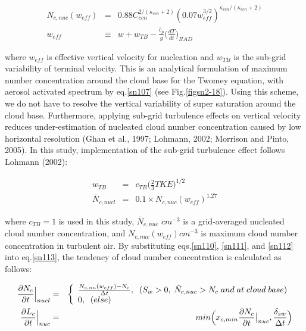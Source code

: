 \begin{eqnarray}
N_{c,nuc}(w_{eff})&=&0.88C_{ccn}^{2/(\kappa_{ccn}+2)}(0.07w_{eff}^{3/2})^{\kappa_{ccn}/(\kappa_{ccn}+2)}\label{sn110}\\
w_{eff}&\equiv&w+w_{TB}-\frac{\bar{c}_{p}}{g}\bigl(\frac{dT}{dt}\bigr)_{RAD}\label{sn111}
\end{eqnarray}

where $w_{eff}$ is effective vertical velocity for nucleation and $w_{TB}$ is the sub-grid variability of terminal velocity. This is an analytical formulation of maximum number concentration around the cloud base for the Twomey equation, with aerosol activated spectrum by eq.\ref{sn107} (see Fig.\ref{figsn2-18}). Using this scheme, we do not have to resolve the vertical variability of super saturation around the cloud base. Furthermore, applying sub-grid turbulence effects on vertical velocity reduces under-estimation of nucleated cloud number concentration caused by low horizontal resolution (Ghan et al., 1997; Lohmann, 2002; Morrison and Pinto, 2005). In this study, implementation of the sub-grid turbulence effect follows Lohmann (2002):

\begin{eqnarray}
w_{TB}&=&c_{TB}\bigl(\frac{2}{3}TKE\bigr)^{1/2}\label{sn112}\\
\bar{N}_{c,nucl}&=&0.1\times N_{c,nuc}(w_{eff})^{1.27}\label{sn113}
\end{eqnarray}

where $c_{TB} = 1$ is used in this study, $\bar{N}_{c,nuc}$ $cm^{-3}$ is a grid-averaged nucleated cloud number concentration, and $N_{c,nuc}(w_{eff}) cm^{-3}$ is maximum cloud number concentration in turbulent air. By substituting eqs.\ref{sn110}, \ref{sn111}, and \ref{sn112} into eq.\ref{sn113}, the tendency of cloud number concentration is calculated as follows:

\begin{eqnarray}
\frac{\partial N_{c}}{\partial t}\Bigr|_{nucl}&=&
\left\{
\begin{array}{l}
\frac{N_{c,nu}(w_{eff})-N_{c}}{\Delta t},\;\;(S_{w}>0,\;\bar{N}_{c,nuc}>N_{c}\;and\;at\;cloud\;base) \\
0,\;\;(else) \\
\label{sn114}
\end{array}
\right.\\
\frac{\partial L_{c}}{\partial t}\Bigr|_{nuc}&=&min\Bigl(x_{c,min}\frac{\partial N_{c}}{\partial t}\bigr|_{nuc},\frac{\delta_{sw}}{\Delta t}\Bigr)\label{sn115}
\end{eqnarray}


